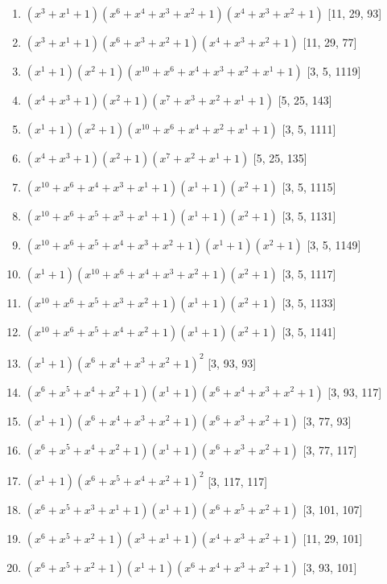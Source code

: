 \documentclass[10pt,twocolumn]{article}
\begin{document}
\begin{enumerate}
\item $(x^{3} + x^{1} + 1)(x^{6} + x^{4} + x^{3} + x^{2} + 1)(x^{4} + x^{3} + x^{2} + 1)$  [11, 29, 93]
\item $(x^{3} + x^{1} + 1)(x^{6} + x^{3} + x^{2} + 1)(x^{4} + x^{3} + x^{2} + 1)$  [11, 29, 77]
\item $(x^{1} + 1)(x^{2} + 1)(x^{10} + x^{6} + x^{4} + x^{3} + x^{2} + x^{1} + 1)$  [3, 5, 1119]
\item $(x^{4} + x^{3} + 1)(x^{2} + 1)(x^{7} + x^{3} + x^{2} + x^{1} + 1)$  [5, 25, 143]
\item $(x^{1} + 1)(x^{2} + 1)(x^{10} + x^{6} + x^{4} + x^{2} + x^{1} + 1)$  [3, 5, 1111]
\item $(x^{4} + x^{3} + 1)(x^{2} + 1)(x^{7} + x^{2} + x^{1} + 1)$  [5, 25, 135]
\item $(x^{10} + x^{6} + x^{4} + x^{3} + x^{1} + 1)(x^{1} + 1)(x^{2} + 1)$  [3, 5, 1115]
\item $(x^{10} + x^{6} + x^{5} + x^{3} + x^{1} + 1)(x^{1} + 1)(x^{2} + 1)$  [3, 5, 1131]
\item $(x^{10} + x^{6} + x^{5} + x^{4} + x^{3} + x^{2} + 1)(x^{1} + 1)(x^{2} + 1)$  [3, 5, 1149]
\item $(x^{1} + 1)(x^{10} + x^{6} + x^{4} + x^{3} + x^{2} + 1)(x^{2} + 1)$  [3, 5, 1117]
\item $(x^{10} + x^{6} + x^{5} + x^{3} + x^{2} + 1)(x^{1} + 1)(x^{2} + 1)$  [3, 5, 1133]
\item $(x^{10} + x^{6} + x^{5} + x^{4} + x^{2} + 1)(x^{1} + 1)(x^{2} + 1)$  [3, 5, 1141]
\item $(x^{1} + 1)(x^{6} + x^{4} + x^{3} + x^{2} + 1)^{2}$  [3, 93, 93]
\item $(x^{6} + x^{5} + x^{4} + x^{2} + 1)(x^{1} + 1)(x^{6} + x^{4} + x^{3} + x^{2} + 1)$  [3, 93, 117]
\item $(x^{1} + 1)(x^{6} + x^{4} + x^{3} + x^{2} + 1)(x^{6} + x^{3} + x^{2} + 1)$  [3, 77, 93]
\item $(x^{6} + x^{5} + x^{4} + x^{2} + 1)(x^{1} + 1)(x^{6} + x^{3} + x^{2} + 1)$  [3, 77, 117]
\item $(x^{1} + 1)(x^{6} + x^{5} + x^{4} + x^{2} + 1)^{2}$  [3, 117, 117]
\item $(x^{6} + x^{5} + x^{3} + x^{1} + 1)(x^{1} + 1)(x^{6} + x^{5} + x^{2} + 1)$  [3, 101, 107]
\item $(x^{6} + x^{5} + x^{2} + 1)(x^{3} + x^{1} + 1)(x^{4} + x^{3} + x^{2} + 1)$  [11, 29, 101]
\item $(x^{6} + x^{5} + x^{2} + 1)(x^{1} + 1)(x^{6} + x^{4} + x^{3} + x^{2} + 1)$  [3, 93, 101]

\end{enumerate}
\end{document}
